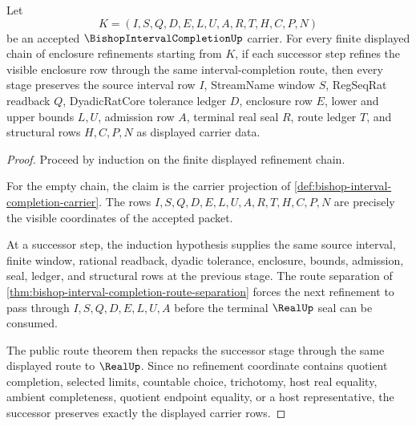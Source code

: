 \begin{theorem}
\label{thm:bishop-interval-completion-nested-enclosure-induction}
Let
$$
K=(I,S,Q,D,E,L,U,A,R,T,H,C,P,N)
$$
be an accepted $\BishopIntervalCompletionUp$ carrier. For every finite displayed chain of enclosure refinements starting from $K$, if each successor step refines the visible enclosure row through the same interval-completion route, then every stage preserves the source interval row $I$, StreamName window $S$, RegSeqRat readback $Q$, DyadicRatCore tolerance ledger $D$, enclosure row $E$, lower and upper bounds $L,U$, admission row $A$, terminal real seal $R$, route ledger $T$, and structural rows $H,C,P,N$ as displayed carrier data.
\end{theorem}
\begin{proof}
Proceed by induction on the finite displayed refinement chain.

For the empty chain, the claim is the carrier projection of \autoref{def:bishop-interval-completion-carrier}. The rows $I,S,Q,D,E,L,U,A,R,T,H,C,P,N$ are precisely the visible coordinates of the accepted packet.

At a successor step, the induction hypothesis supplies the same source interval, finite window, rational readback, dyadic tolerance, enclosure, bounds, admission, seal, ledger, and structural rows at the previous stage. The route separation of \autoref{thm:bishop-interval-completion-route-separation} forces the next refinement to pass through $I,S,Q,D,E,L,U,A$ before the terminal $\RealUp$ seal can be consumed.

The public route theorem then repacks the successor stage through the same displayed route to $\RealUp$. Since no refinement coordinate contains quotient completion, selected limits, countable choice, trichotomy, host real equality, ambient completeness, quotient endpoint equality, or a host representative, the successor preserves exactly the displayed carrier rows.
\end{proof}

